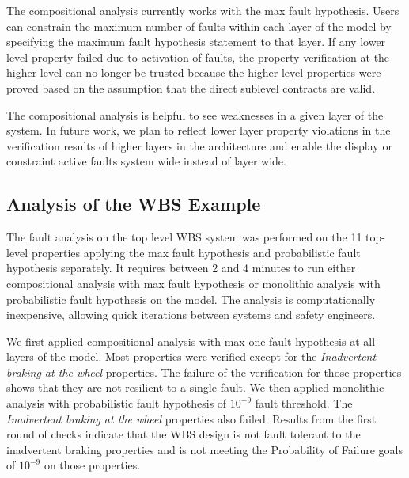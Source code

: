 The compositional analysis currently works with the max fault hypothesis. Users can constrain the maximum number of faults within each layer of the model by specifying the maximum fault hypothesis statement to that layer. If any lower level property failed due to activation of faults, the property verification at the higher level can no longer be trusted because the higher level properties were proved based on the assumption that the direct sublevel contracts are valid.

The compositional analysis is helpful to see weaknesses in a given 
layer of the system. In future work, we plan to reflect lower layer
property violations in the verification results of higher layers in the architecture and enable the display or constraint active faults system wide instead of layer wide.


\subsection{Analysis of the WBS Example}
\label{sec:results}

The fault analysis on the top level WBS system was performed on the 11 top-level properties applying the max fault hypothesis and probabilistic fault hypothesis separately. It requires between 2 and 4 minutes to run either compositional analysis with max fault hypothesis or monolithic analysis with probabilistic fault hypothesis on the model. The analysis is computationally inexpensive, allowing quick iterations between systems and safety engineers.

We first applied compositional analysis with max one fault hypothesis at all layers of the model. Most properties were verified except for the \textit{Inadvertent braking at the wheel} properties. The failure of the verification for those properties shows that they are not resilient to a single fault. We then applied monolithic analysis with probabilistic fault hypothesis of $10^{-9}$ fault threshold. The \textit{Inadvertent braking at the wheel} properties also failed. Results from the first round of checks indicate that the WBS design is not fault tolerant to the inadvertent braking properties and is not meeting the Probability of Failure goals of $10^{-9}$ on those properties.

